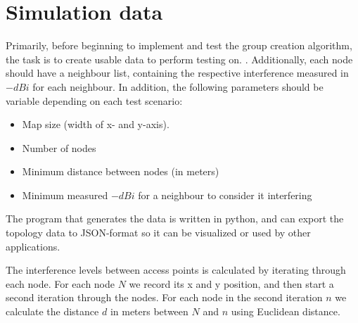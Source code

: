 \documentclass[11pt,a4paper,UKenglish]{report}
\begin{document}
\section{Simulation data}
Primarily, before beginning to implement and test the group creation algorithm, the task
is to create usable data to perform testing on. . Additionally, each node should have a neighbour list,
containing the respective interference measured in $-dBi$ for each neighbour. In addition,
the following parameters should be variable depending on each test scenario:

\begin{itemize}
\item Map size (width of x- and y-axis).
\item Number of nodes
\item Minimum distance between nodes (in meters)
\item Minimum measured $-dBi$ for a neighbour to consider it interfering
\end{itemize}

The program that generates the data is written in python, and can export the topology data to
JSON-format so it can be visualized or used by other applications.

The interference levels between access points is calculated by iterating through each node.
For each node $N$ we record its x and y position, and then start a second iteration through the nodes.
For each node in the second iteration $n$ we calculate the distance $d$ in
meters between $N$ and $n$ using Euclidean distance.



\printbibliography
\end{document}
